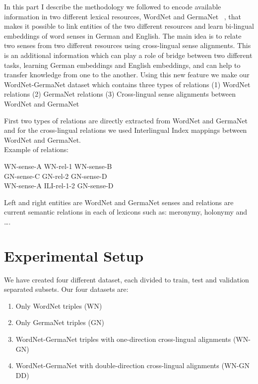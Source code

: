 In this part I describe the methodology we followed to encode available information 
in two different lexical resources, WordNet and GermaNet ~\cite{BirgitHamp},
that makes it possible to link entities of the two different resources and learn bi-lingual 
embeddings of word senses in German and English.  
The main idea is to relate two senses from two different resources using cross-lingual sense alignments.
This is an additional information which can play a role of bridge between two
different tasks, learning German embeddings and English embeddings, and can help to transfer knowledge from one to the another.
Using this new feature we make our WordNet-GermaNet dataset which contains three
types of relations
(1) WordNet relations 
(2) GermaNet relations
(3) Cross-lingual sense alignments between WordNet and GermaNet

First two types of relations are directly extracted from WordNet and GermaNet and for the 
cross-lingual relations we used Interlingual Index mappings between WordNet and GermaNet.
\\
Example of relations:
\begin{center}
WN-sense-A \hspace{0.3in}  WN-rel-1    \hspace{0.3in}  WN-sense-B\\
GN-sense-C \hspace{0.3in}  GN-rel-2    \hspace{0.3in}  GN-sense-D\\
WN-sense-A \hspace{0.3in}  ILI-rel-1-2 \hspace{0.3in}  GN-sense-D\\
\end{center}

Left and right entities are WordNet and GermaNet senses and relations are current semantic relations
 in each of lexicons such as:
 meronymy, holonymy and \ldots.


\section{Experimental Setup}
\label{sec:xkb-exp}

 
 We have created four different dataset, each divided to train, test and validation separated subsets. Our four datasets are:
 \begin{enumerate}
 \item Only WordNet triples (WN)
 \item Only GermaNet triples (GN)
 \item WordNet-GermaNet triples with one-direction cross-lingual alignments (WN-GN)
 \item WordNet-GermaNet with double-direction cross-lingual alignments (WN-GN DD)
 \end{enumerate}
 
